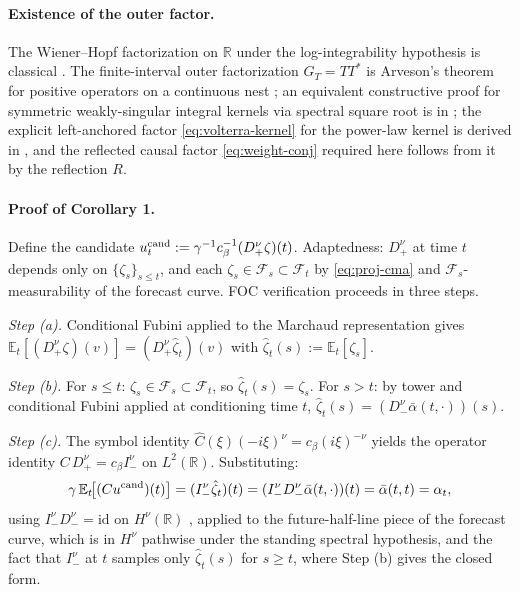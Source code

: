 \documentclass[11pt]{article}
\newcommand{\R}{\mathbb{R}}
\newcommand{\E}{\mathbb{E}}
\newcommand{\F}{\mathcal{F}}
\theoremstyle{plain}
\begin{document}
\paragraph{Existence of the outer factor.} The Wiener--Hopf factorization on $\R$ under the log-integrability hypothesis is classical \citep{WienerHopf1931,Krein1962}. The finite-interval outer factorization $G_T = TT^*$ is Arveson's theorem for positive operators on a continuous nest \citep[Thm~4.4.2]{Arveson1975}; an equivalent constructive proof for symmetric weakly-singular integral kernels via spectral square root is in \citep[Ex.~6.2/9.2]{PorterStirling1990}; the explicit left-anchored factor \eqref{eq:volterra-kernel} for the power-law kernel is derived in \citep[pp.~590--591]{FordeSanchezSmith2022}, and the reflected causal factor \eqref{eq:weight-conj} required here follows from it by the reflection $R$.

\paragraph{Proof of Corollary 1.} Define the candidate $u^{\rm cand}_t := \gamma^{-1}c_\beta^{-1}(D_+^\nu\zeta)(t)$. Adaptedness: $D_+^\nu$ at time $t$ depends only on $\{\zeta_s\}_{s\le t}$, and each $\zeta_s \in \F_s\subset\F_t$ by \eqref{eq:proj-cma} and $\F_s$-measurability of the forecast curve. FOC verification proceeds in three steps.

\emph{Step (a).} Conditional Fubini \citep[Thm~14.16]{Klenke2014} applied to the Marchaud representation gives $\E_t[(D_+^\nu\zeta)(v)] = (D_+^\nu \hat\zeta_t)(v)$ with $\hat\zeta_t(s) := \E_t[\zeta_s]$.

\emph{Step (b).} For $s \le t$: $\zeta_s \in \F_s\subset\F_t$, so $\hat\zeta_t(s) = \zeta_s$. For $s > t$: by tower and conditional Fubini applied at conditioning time $t$, $\hat\zeta_t(s) = (D_-^\nu\bar\alpha(t,\cdot))(s)$.

\emph{Step (c).} The symbol identity $\hat C(\xi)(-i\xi)^\nu = c_\beta(i\xi)^{-\nu}$ yields the operator identity $C\,D_+^\nu = c_\beta I_-^\nu$ on $L^2(\R)$. Substituting:
\[
\gamma\,\E_t\!\bigl[(Cu^{\rm cand})(t)\bigr] = (I_-^\nu\hat\zeta_t)(t) = (I_-^\nu D_-^\nu\bar\alpha(t,\cdot))(t) = \bar\alpha(t,t) = \alpha_t,
\]
using $I_-^\nu D_-^\nu = \mathrm{id}$ on $H^\nu(\R)$ \citep[\S5.3 Thm 5.3]{SamkoKilbasMarichev1993}, applied to the future-half-line piece of the forecast curve, which is in $H^\nu$ pathwise under the standing spectral hypothesis, and the fact that $I_-^\nu$ at $t$ samples only $\hat\zeta_t(s)$ for $s\ge t$, where Step (b) gives the closed form.
\end{document}

